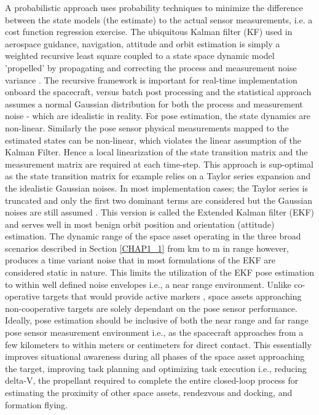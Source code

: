 A probabilistic approach uses probability techniques to minimize the difference between the state models (the estimate) to the actual sensor measurements, i.e. a cost function regression exercise. The ubiquitous Kalman filter (KF) used in  aerospace guidance, navigation, attitude and orbit estimation is simply a weighted recursive least square coupled to a state space dynamic model 'propelled' by propagating and correcting the process and measurement noise variance \cite{franklinDigitalControl97}. The recursive framework is important for real-time implementation onboard the spacecraft, versus batch post processing and the statistical approach assumes a normal Gaussian distribution for both the process and measurement noise - which are idealistic in reality. For pose estimation, the state dynamics are non-linear. Similarly the pose sensor physical measurements mapped to the estimated states can be non-linear, which violates the linear assumption of the Kalman Filter. Hence a local linearization of the state transition matrix and the measurement matrix are required at each time-step. This approach is sup-optimal as the state transition matrix for example relies on a Taylor series expansion and the idealistic Gaussian noises. In most implementation cases; the Taylor series is truncated and only the first two dominant terms are considered but the Gaussian noises are still assumed \cite{franklinDigitalControl97,cavenagoEkfHighOrder19}. This version is called the Extended Kalman filter (EKF) and serves well in most benign orbit position and orientation (attitude) estimation. The dynamic range of the space asset operating in the three broad scenarios described in Section \ref{CHAP1_1} from km to m in range however, produces a time variant noise that in most formulations of the EKF are considered static in nature. This limits the utilization of the EKF pose estimation to within well defined noise envelopes i.e., a near range environment. Unlike co-operative targets that would provide active markers \cite{OpromollaPose17}, space assets approaching non-cooperative targets are solely dependant on the pose sensor performance. Ideally, pose estimation should be inclusive of both the near range and far range pose sensor measurement environment i.e., as the spacecraft approaches from a few kilometers to within meters or centimeters for direct contact. This essentially improves situational awareness during all phases of the space asset approaching the target, improving task planning and optimizing task execution i.e., reducing delta-V, the propellant required to complete the entire closed-loop process for estimating the proximity of other space assets, rendezvous and docking, and formation flying.


